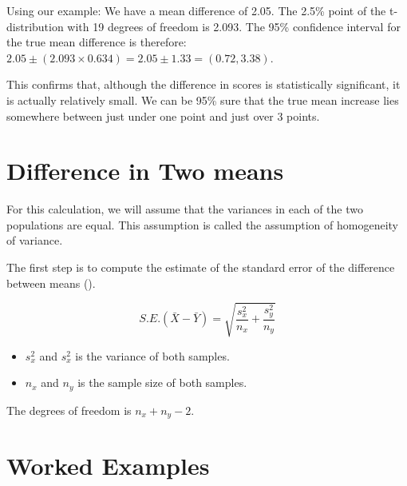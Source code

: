 \documentclass[]{report}
\begin{document}
Using our example:
We have a mean difference of 2.05. The 2.5\% point of the t-distribution with 19 degrees
of freedom is 2.093. The 95\% confidence interval for the true mean difference is therefore:
$2.05 \pm (2.093 \times 0.634) = 2.05 \pm 1.33 = (0.72, 3.38)$.

This confirms that, although the difference in scores is statistically significant, it is actually
relatively small. We can be 95\% sure that the true mean increase lies somewhere between
just under one point and just over 3 points.










\section{Difference in Two means}
For this calculation, we will assume that the variances in each of the two populations are equal. This assumption is called the assumption of homogeneity of variance.

The first step is to compute the estimate of the standard error of the difference between means ().

\[ S.E.(\bar{X}-\bar{Y}) = \sqrt{\frac{s^2_x}{n_x} + \frac{s^2_y}{n_y}} \]

\begin{itemize}
\item $s^2_x$ and $s^2_x$ is the variance of both samples.
\item $n_x$ and $n_y$ is the sample size of both samples.
\end{itemize}
The degrees of freedom is $n_x + n_y -2$.




%
%
%
%





\section{Worked Examples} 
\end{document}
